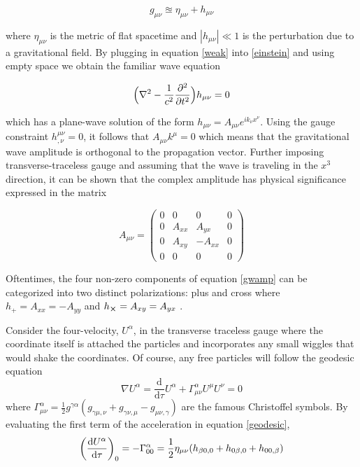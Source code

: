 	\begin{equation} \label{weak}
	g_{\mu \nu}  \approxeq \eta_{\mu \nu} + h_{\mu \nu}
	\end{equation}
	
	where $\eta_{\mu \nu}$ is the metric of flat spacetime and $|h_{\mu \nu}| \ll 1$ is the perturbation due to a gravitational field.	By plugging in equation \ref{weak} into \ref{einstein} and using empty space we obtain the familiar wave equation
	
	\begin{equation} \label{wave}
	\Big(\nabla^2 - \frac{1}{c^2} \pdv[2]{t} \Big) h_{\mu \nu}  = 0
	\end{equation}

	which has a plane-wave solution of the form $h_{\mu \nu} = A_{\mu \nu} e^{ik_{\nu} x^{\nu}}$. Using the gauge constraint $h^{\mu \nu}_{,\nu} = 0$, it follows that $A_{\mu \nu} k^{\mu} = 0$ which means that the gravitational wave amplitude is orthogonal to the propagation vector. Further imposing transverse-traceless gauge and assuming that the wave is traveling in the $x^3$ direction, it can be shown that the complex amplitude has physical significance expressed in the matrix
	
	\begin{equation} \label{gwamp}
	A_{\mu \nu} = 
	\begin{pmatrix}
			0 &    0   &  0      & 0 
		 \\ 0 & A_{xx} &  A_{yx} & 0
		 \\ 0 & A_{xy} & -A_{xx} & 0
		 \\ 0 &    0   &  0      & 0
	\end{pmatrix}
	\end{equation}

	Oftentimes, the four non-zero components of equation \ref{gwamp} can be categorized into two distinct polarizations: plus and cross where $h_{+} = A_{xx} = -A_{yy}$ and $h_{\cross} = A_{xy} = A_{yx}$ .
 
	Consider the four-velocity, $U^{\alpha}$, in the transverse traceless gauge where the coordinate itself is attached the particles and incorporates any small wiggles that would shake the coordinates.  Of course, any free particles will follow the geodesic equation
	\begin{equation}\label{geodesic}
	\nabla U^{\alpha} = \frac{\text{d}}{\text{d} \tau} U^{\alpha} + \Gamma^{\alpha}_{\mu \nu} U^{\mu} U^{\nu} = 0
	\end{equation}	
	where $\Gamma^{\alpha}_{\mu \nu} = \frac{1}{2} g^{\gamma \alpha}(g_{\gamma \mu, \nu} + g_{\gamma \nu,\mu} - g_{\mu \nu, \gamma} )$ are the famous Christoffel symbols.
	By evaluating the first term of the acceleration in equation \ref{geodesic},
	\begin{equation}\label{accel}
	\bigg(\frac{\text{d}U^{\alpha}}{\text{d}\tau}\bigg)_0 = -\Gamma^{\alpha}_{00} 
	\\ = \frac{1}{2} \eta_{\mu \nu} (h_{\beta 0, 0} + h_{0 \beta, 0} + h_{0 0, \beta} )
	\end{equation}
	
